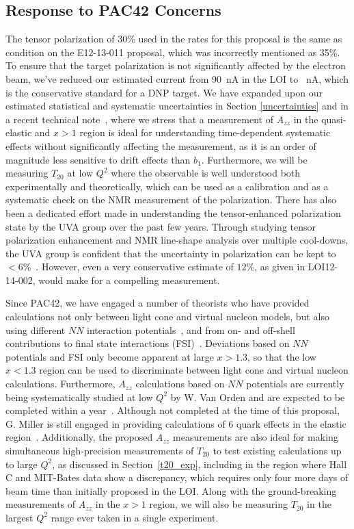 \subsection{Response to PAC42 Concerns}
The tensor polarization of 30\% used in the rates for this proposal is the same as condition on the E12-13-011 proposal, which was incorrectly mentioned as 35\%. To ensure that the target polarization is not significantly affected by the electron beam, we've reduced our estimated current from 90~nA in the LOI to \CURRENT~nA, which is the conservative standard for a DNP target. We have expanded upon our estimated statistical and systematic uncertainties in Section \ref{uncertainties} and in a recent technical note~\cite{Keller:2015tn}, where we stress that a measurement of $A_{zz}$ in the quasi-elastic and $x>1$ region is ideal for understanding time-dependent systematic effects without significantly affecting the measurement, as it is an order of magnitude less sensitive to drift effects than $b_1$. Furthermore, we will be measuring $T_{20}$ at low $Q^2$ where the observable is well understood both experimentally and theoretically, which can be used as a calibration and as a systematic check on the NMR measurement of
the polarization. There has also been a dedicated effort made in understanding the tensor-enhanced polarization state by the UVA group over the past few years. Through studying tensor polarization enhancement and NMR line-shape analysis over multiple cool-downs, the UVA group is confident that the uncertainty in polarization can be kept to $<6\%$~\cite{keller2, keller3}. However, even a very conservative estimate of $12\%$, as given in LOI12-14-002, would make for a compelling measurement.

Since PAC42, we have engaged a number of theorists who have provided calculations not only between light cone and virtual nucleon models, but also using different $NN$ interaction potentials~\cite{Sargsian:2014fla}, and from on- and off-shell contributions to final state interactions (FSI)~\cite{cosyn-convo}. Deviations based on $NN$ potentials and FSI only become apparent at large $x>1.3$, so that the low $x<1.3$ region can be used to discriminate between light cone and virtual nucleon calculations. Furthermore, $A_{zz}$ calculations based on $NN$ potentials are currently being systematically studied at low $Q^2$ by W. Van Orden and are expected to be completed within a year~\cite{vanorden-convo}. Although not completed at the time of this proposal, G. Miller is still engaged in providing calculations of 6 quark effects in the elastic region~\cite{miller-convo}. Additionally, the proposed $A_{zz}$ measurements are also ideal for making simultaneous high-precision measurements of $T_{20}$ to test existing calculations up to large $Q^2$, as discussed in Section~\ref{t20_exp}, including in the region where Hall C and MIT-Bates data show a discrepancy, which requires only four more days of beam time than initially proposed in the LOI. Along with the ground-breaking measurements of $A_{zz}$ in the $x>1$ region, we will also be measuring $T_{20}$ in the largest $Q^2$ range ever taken in a single experiment.





